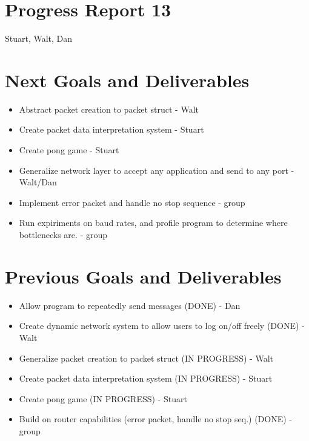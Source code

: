 \documentclass{article}
\begin{document}
\section*{Progress Report 13}
Stuart, Walt, Dan

\section*{Next Goals and Deliverables}
\begin{itemize}
    \item Abstract packet creation to packet struct - Walt
    \item Create packet data interpretation system - Stuart
    \item Create pong game - Stuart
    \item Generalize network layer to accept any application and send to any port - Walt/Dan
    \item Implement error packet and handle no stop sequence - group
    \item Run expiriments on baud rates, and profile program to determine where bottlenecks are. - group
\end{itemize}

\section*{Previous Goals and Deliverables}
\begin{itemize}
    \item Allow program to repeatedly send messages (DONE) - Dan
    \item Create dynamic network system to allow users to log on/off freely (DONE) - Walt
    \item Generalize packet creation to packet struct (IN PROGRESS) - Walt
    \item Create packet data interpretation system (IN PROGRESS) - Stuart
    \item Create pong game (IN PROGRESS) - Stuart
    \item Build on router capabilities (error packet, handle no stop seq.) (DONE) - group
\end{itemize}

\end{document}
